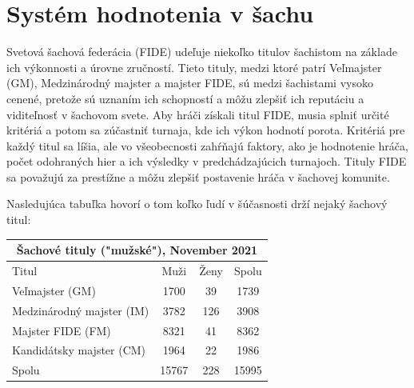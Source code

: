 \documentclass[10pt,oneside,slovak,a4paper]{article}
\begin{document}
\vspace*{\fill}

\section{Systém hodnotenia v šachu}
Svetová šachová federácia (FIDE) udeľuje niekoľko titulov šachistom na základe ich výkonnosti a úrovne zručností. Tieto tituly, medzi ktoré patrí Veľmajster (GM), Medzinárodný majster a majster FIDE, sú medzi šachistami vysoko cenené, pretože sú uznaním ich schopností a môžu zlepšiť ich reputáciu a viditeľnosť v šachovom svete. Aby hráči získali titul FIDE, musia splniť určité kritériá a potom sa zúčastniť turnaja, kde ich výkon hodnotí porota. Kritériá pre každý titul sa líšia, ale vo všeobecnosti zahŕňajú faktory, ako je hodnotenie hráča, počet odohraných hier a ich výsledky v predchádzajúcich turnajoch. Tituly FIDE sa považujú za prestížne a môžu zlepšiť postavenie hráča v šachovej komunite.

Nasledujúca tabuľka\cite{FIDE} hovorí o tom koľko ľudí v šúčasnosti drží nejaký šachový titul:


\begin{table}[H]
		\def\arraystretch{1.5}
		\begin{tabular}{|lccc|}
			\hline
			\multicolumn{4}{|c|}{Šachové tituly ("mužské"), November 2021}                                                     \\ \hline
			\multicolumn{1}{|l|}{Titul}                       & \multicolumn{1}{c|}{Muži}  & \multicolumn{1}{c|}{Ženy} & Spolu \\ \hline
			\multicolumn{1}{|l|}{Veľmajster (GM)}             & \multicolumn{1}{c|}{1700}  & \multicolumn{1}{c|}{39}   & 1739  \\ \hline
			\multicolumn{1}{|l|}{Medzinárodný   majster (IM)} & \multicolumn{1}{c|}{3782}  & \multicolumn{1}{c|}{126}  & 3908  \\ \hline
			\multicolumn{1}{|l|}{Majster FIDE   (FM)}         & \multicolumn{1}{c|}{8321}  & \multicolumn{1}{c|}{41}   & 8362  \\ \hline
			\multicolumn{1}{|l|}{Kandidátsky   majster (CM)}  & \multicolumn{1}{c|}{1964}  & \multicolumn{1}{c|}{22}   & 1986  \\ \hline
			\multicolumn{1}{|l|}{Spolu}                       & \multicolumn{1}{c|}{15767} & \multicolumn{1}{c|}{228}  & 15995 \\ \hline
		\end{tabular}
\end{table}
\end{document}
